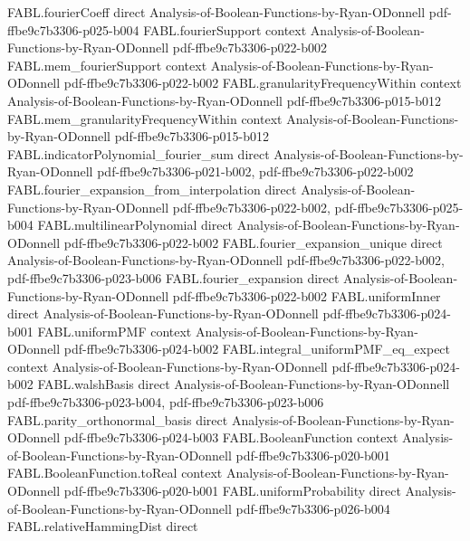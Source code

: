 \begin{theorem}
\proofstep
  {FABL.fourierCoeff}
  {direct}
  {Analysis-of-Boolean-Functions-by-Ryan-ODonnell}
  {pdf-ffbe9c7b3306-p025-b004}
\proofstep
  {FABL.fourierSupport}
  {context}
  {Analysis-of-Boolean-Functions-by-Ryan-ODonnell}
  {pdf-ffbe9c7b3306-p022-b002}
\proofstep
  {FABL.mem_fourierSupport}
  {context}
  {Analysis-of-Boolean-Functions-by-Ryan-ODonnell}
  {pdf-ffbe9c7b3306-p022-b002}
\proofstep
  {FABL.granularityFrequencyWithin}
  {context}
  {Analysis-of-Boolean-Functions-by-Ryan-ODonnell}
  {pdf-ffbe9c7b3306-p015-b012}
\proofstep
  {FABL.mem_granularityFrequencyWithin}
  {context}
  {Analysis-of-Boolean-Functions-by-Ryan-ODonnell}
  {pdf-ffbe9c7b3306-p015-b012}
\proofstep
  {FABL.indicatorPolynomial_fourier_sum}
  {direct}
  {Analysis-of-Boolean-Functions-by-Ryan-ODonnell}
  {pdf-ffbe9c7b3306-p021-b002,
    pdf-ffbe9c7b3306-p022-b002}
\proofstep
  {FABL.fourier_expansion_from_interpolation}
  {direct}
  {Analysis-of-Boolean-Functions-by-Ryan-ODonnell}
  {pdf-ffbe9c7b3306-p022-b002,
    pdf-ffbe9c7b3306-p025-b004}
\proofstep
  {FABL.multilinearPolynomial}
  {direct}
  {Analysis-of-Boolean-Functions-by-Ryan-ODonnell}
  {pdf-ffbe9c7b3306-p022-b002}
\proofstep
  {FABL.fourier_expansion_unique}
  {direct}
  {Analysis-of-Boolean-Functions-by-Ryan-ODonnell}
  {pdf-ffbe9c7b3306-p022-b002,
    pdf-ffbe9c7b3306-p023-b006}
\proofstep
  {FABL.fourier_expansion}
  {direct}
  {Analysis-of-Boolean-Functions-by-Ryan-ODonnell}
  {pdf-ffbe9c7b3306-p022-b002}
\proofstep
  {FABL.uniformInner}
  {direct}
  {Analysis-of-Boolean-Functions-by-Ryan-ODonnell}
  {pdf-ffbe9c7b3306-p024-b001}
\proofstep
  {FABL.uniformPMF}
  {context}
  {Analysis-of-Boolean-Functions-by-Ryan-ODonnell}
  {pdf-ffbe9c7b3306-p024-b002}
\proofstep
  {FABL.integral_uniformPMF_eq_expect}
  {context}
  {Analysis-of-Boolean-Functions-by-Ryan-ODonnell}
  {pdf-ffbe9c7b3306-p024-b002}
\proofstep
  {FABL.walshBasis}
  {direct}
  {Analysis-of-Boolean-Functions-by-Ryan-ODonnell}
  {pdf-ffbe9c7b3306-p023-b004,
    pdf-ffbe9c7b3306-p023-b006}
\proofstep
  {FABL.parity_orthonormal_basis}
  {direct}
  {Analysis-of-Boolean-Functions-by-Ryan-ODonnell}
  {pdf-ffbe9c7b3306-p024-b003}
\proofstep
  {FABL.BooleanFunction}
  {context}
  {Analysis-of-Boolean-Functions-by-Ryan-ODonnell}
  {pdf-ffbe9c7b3306-p020-b001}
\proofstep
  {FABL.BooleanFunction.toReal}
  {context}
  {Analysis-of-Boolean-Functions-by-Ryan-ODonnell}
  {pdf-ffbe9c7b3306-p020-b001}
\proofstep
  {FABL.uniformProbability}
  {direct}
  {Analysis-of-Boolean-Functions-by-Ryan-ODonnell}
  {pdf-ffbe9c7b3306-p026-b004}
\proofstep
  {FABL.relativeHammingDist}
  {direct}

\end{theorem}
